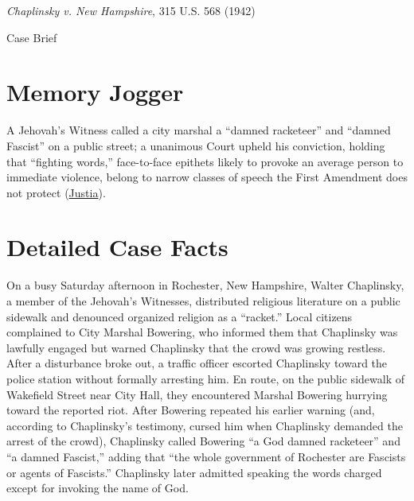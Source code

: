 \documentclass[12pt]{article}
\begin{document}
\begin{center}
{\LARGE \textit{Chaplinsky v. New Hampshire}, 315 U.S. 568 (1942)\par}
\vspace{0.8em}
{\large Case Brief\par}
\end{center}
\vspace{1em}

\section{Memory Jogger}
A Jehovah's Witness called a city marshal a ``damned racketeer'' and ``damned Fascist'' on a public street; a unanimous Court upheld his conviction, holding that ``fighting words,'' face-to-face epithets likely to provoke an average person to immediate violence, belong to narrow classes of speech the First Amendment does not protect (\href{https://supreme.justia.com/cases/federal/us/315/568/}{Justia}).

\section{Detailed Case Facts}
On a busy Saturday afternoon in Rochester, New Hampshire, Walter Chaplinsky, a member of the Jehovah's Witnesses, distributed religious literature on a public sidewalk and denounced organized religion as a ``racket.'' Local citizens complained to City Marshal Bowering, who informed them that Chaplinsky was lawfully engaged but warned Chaplinsky that the crowd was growing restless. After a disturbance broke out, a traffic officer escorted Chaplinsky toward the police station without formally arresting him. En route, on the public sidewalk of Wakefield Street near City Hall, they encountered Marshal Bowering hurrying toward the reported riot. After Bowering repeated his earlier warning (and, according to Chaplinsky's testimony, cursed him when Chaplinsky demanded the arrest of the crowd), Chaplinsky called Bowering ``a God damned racketeer'' and ``a damned Fascist,'' adding that ``the whole government of Rochester are Fascists or agents of Fascists.'' Chaplinsky later admitted speaking the words charged except for invoking the name of God.
\end{document}
